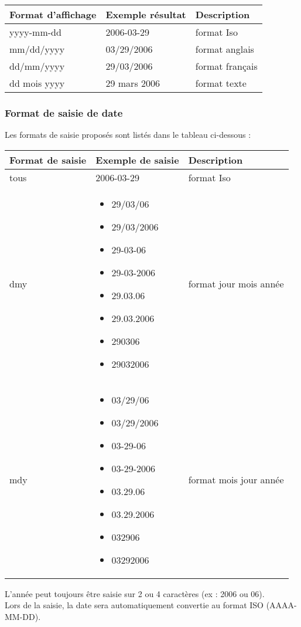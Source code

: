 \begin{tabular}{|p{4cm}|p{4cm}|p{4cm}|}
\hline
\textbf{Format d'affichage} & \textbf{Exemple résultat} & \textbf{Description} \\
\hline
yyyy-mm-dd & 2006-03-29 & format Iso\\
\hline
mm/dd/yyyy & 03/29/2006 & format anglais\\
\hline
dd/mm/yyyy & 29/03/2006 & format français\\
\hline
dd mois yyyy & 29 mars 2006 & format texte\\
\hline
\end{tabular}

\subsubsection{Format de saisie de date}

Les formats de saisie proposés sont listés dans le tableau ci-dessous :\\

\begin{tabular}{|p{4cm}|p{4cm}|p{4cm}|}
\hline
\textbf{Format de saisie} & \textbf{Exemple de saisie} & \textbf{Description} \\
\hline
tous & 2006-03-29 & format Iso\\
\hline
dmy &
\begin{itemize}
\item 29/03/06
\item 29/03/2006
\item 29-03-06
\item 29-03-2006
\item 29.03.06
\item 29.03.2006
\item 290306
\item 29032006
\end{itemize}
& format jour mois année\\
\hline
mdy &
\begin{itemize}
\item 03/29/06
\item 03/29/2006
\item 03-29-06
\item 03-29-2006
\item 03.29.06
\item 03.29.2006
\item 032906
\item 03292006
\end{itemize}
& format mois jour année\\
\hline
\end{tabular}
\vspace{0.3cm}

L'année peut toujours être saisie sur 2 ou 4 caractères  (ex : 2006 ou 06).\\
Lors de la saisie, la date sera automatiquement convertie au format ISO (AAAA-MM-DD).

